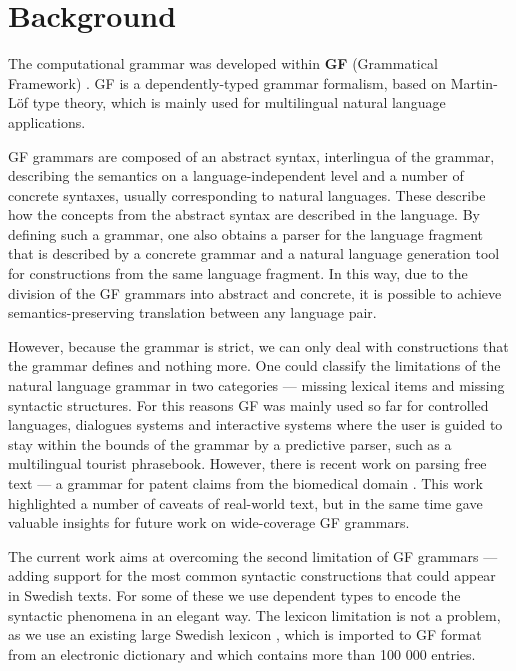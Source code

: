 \documentclass[runningheads,a4paper]{llncs}
\begin{document}
\section{Background}


The computational grammar was developed within \textbf{GF} (Grammatical
Framework) \cite{gfbok}. GF is a dependently-typed grammar formalism,
based on Martin-Löf type theory, which is mainly used for
multilingual natural language applications. 

GF grammars are composed of an abstract syntax, interlingua of the
grammar, describing the semantics on a language-independent level and
a number of concrete syntaxes, usually corresponding to natural
languages. These describe how the concepts from the abstract syntax
are described in the language. 
By defining such a grammar, one also obtains a parser for the language
fragment that is described by a concrete grammar and a natural
language generation tool for constructions from
the same language fragment. 
In this way, due to the division of the GF
grammars into abstract and concrete, it is possible to achieve 
semantics-preserving translation between any language pair.
 
However, because the grammar is strict, we can only deal with
constructions that the grammar defines and nothing more. One could
classify the limitations of the natural language grammar in two
categories --- missing lexical items and missing syntactic
structures. For this reasons GF was mainly used so far for controlled
languages\cite{cnl}, dialogues systems\cite{talk} and interactive 
systems where the user is guided to stay
within the bounds of the grammar by a predictive
parser, such as a multilingual tourist
phrasebook\cite{phrasebook}. 
However, there is recent work on parsing
free text --- a grammar for patent claims from the biomedical
domain \cite{patent}. This work highlighted a
number of caveats of real-world text, but in the same time gave
valuable insights for future work on wide-coverage GF grammars.

The current work aims at overcoming the second limitation of GF
grammars --- adding support for the most common syntactic
constructions that could appear in Swedish texts. For some of these we
use dependent types to encode the syntactic phenomena in an elegant
way. The lexicon limitation is not a problem, as we use an existing 
large Swedish lexicon \cite{ahlbergEnache}, which is imported to GF
format from an electronic dictionary and which contains more than
100 000 entries.\\
\end{document}
